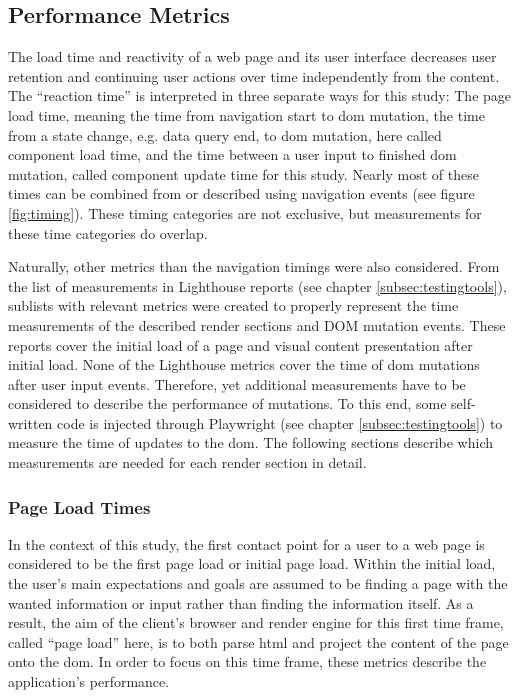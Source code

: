 \documentclass[a4paper, 10pt]{article}
\begin{document}
\subsection{Performance Metrics}\label{subsec:performancemetrics}
% 

The load time and reactivity of a web page and its user interface decreases user retention and continuing user actions over time independently from the content. %
The \enquote{reaction time} is interpreted in three separate ways for this study: The page load time, meaning the time from navigation start to \acrshort{dom} mutation, the time from a state change, e.g. data query end, to \acrshort{dom} mutation, here called component load time, and the time between a user input to finished \acrshort{dom} mutation, called component update time for this study.
Nearly most of these times can be combined from or described using navigation events (see figure \ref{fig:timing}).
These timing categories are not exclusive, but measurements for these time categories do overlap.

Naturally, other metrics than the navigation timings were also considered.
From the list of measurements in Lighthouse reports (see chapter \ref{subsec:testingtools}), sublists with relevant metrics were created to properly represent the time measurements of the described render sections and DOM mutation events.
These reports cover the initial load of a page and visual content presentation after initial load.
None of the Lighthouse metrics cover the time of \acrshort{dom} mutations after user input events.
Therefore, yet additional measurements have to be considered to describe the performance of mutations.
To this end, some self-written code is injected through Playwright (see chapter \ref{subsec:testingtools}) to measure the time of updates to the \acrshort{dom}.
The following sections describe which measurements are needed for each render section in detail.

\subsubsection{Page Load Times}

In the context of this study, the first contact point for a user to a web page is considered to be the first page load or initial page load.
Within the initial load, the user's main expectations and goals are assumed to be finding a page with the wanted information or input rather than finding the information itself.
As a result, the aim of the client's browser and render engine for this first time frame, called \enquote{page load} here, is to both parse \acrshort{html} and project the content of the page onto the \acrshort{dom}.
In order to focus on this time frame, these metrics describe the application's performance.
\end{document}
